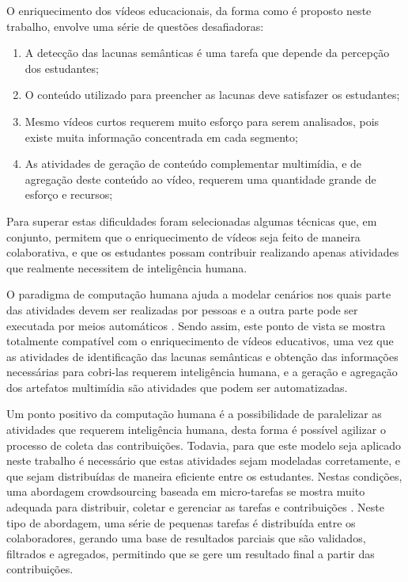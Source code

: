 O enriquecimento dos vídeos educacionais, da forma como é proposto neste trabalho, envolve uma série de questões desafiadoras:
\begin{enumerate}
    \item A detecção das lacunas semânticas é uma tarefa que depende da percepção dos estudantes;
    \item O conteúdo utilizado para preencher as lacunas deve satisfazer os estudantes;
    \item Mesmo vídeos curtos requerem muito esforço para serem analisados, pois existe muita informação concentrada em cada segmento;
    \item As atividades de geração de conteúdo complementar multimídia, e de agregação deste conteúdo ao vídeo, requerem uma quantidade grande de esforço e recursos;
\end{enumerate}


Para superar estas dificuldades foram selecionadas algumas técnicas que, em conjunto, permitem que o enriquecimento de vídeos seja feito de maneira colaborativa, e que os estudantes possam contribuir realizando apenas atividades que realmente necessitem de inteligência humana.

O paradigma de computação humana ajuda a modelar cenários nos quais parte das atividades devem ser realizadas por pessoas e a outra parte pode ser executada por meios automáticos \cite{VonAhn:2005:HC:1168246}. Sendo assim, este ponto de vista se mostra totalmente compatível com o enriquecimento de vídeos educativos, uma vez que as atividades de identificação das lacunas semânticas e obtenção das informações necessárias para cobri-las requerem inteligência humana, e a geração e agregação dos artefatos multimídia são atividades que podem ser automatizadas.

Um ponto positivo da computação humana é a possibilidade de paralelizar as atividades que requerem inteligência humana, desta forma é possível agilizar o processo de coleta das contribuições.  Todavia, para que este modelo seja aplicado neste trabalho é necessário que estas atividades sejam modeladas corretamente, e que sejam distribuídas de maneira eficiente entre os estudantes. Nestas condições, uma abordagem crowdsourcing baseada em micro-tarefas se mostra muito adequada para distribuir, coletar e gerenciar as tarefas e contribuições \cite{Difallah:2015:DMC:2736277.2741685}. Neste tipo de abordagem, uma série de pequenas tarefas é distribuída entre os colaboradores, gerando uma base de resultados parciais que são validados, filtrados e agregados, permitindo que se gere um resultado final a partir das contribuições.

